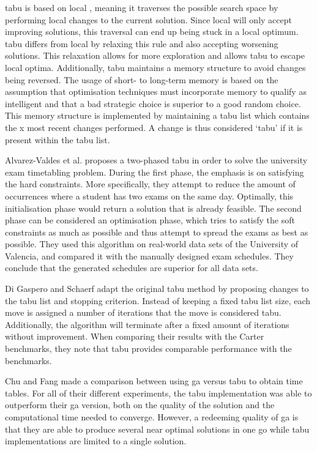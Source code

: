 \acrfull{tabu} \cite{glover1993} is based on \acrfull{local} \cite{lin1973}, meaning it traverses the possible search space by performing local changes to the current solution. Since \acrshort{local} will only accept improving solutions, this traversal can end up being stuck in a local optimum. \acrshort{tabu} differs from \acrshort{local} by relaxing this rule and also accepting worsening solutions. This relaxation allows for more exploration and allows \acrshort{tabu} to escape local optima. Additionally, \acrshort{tabu} maintains a memory structure to avoid changes being reversed. The usage of short- to long-term memory is  based on the assumption that optimisation techniques must incorporate memory to qualify as intelligent and that a bad strategic choice is superior to a good random choice\cite{glover1999}. This memory structure is implemented by maintaining a tabu list which contains the x most recent changes performed. A change is thus considered ‘tabu’ if it is present within the tabu list.

Alvarez-Valdes et al. \cite{alvarez1997} proposes a two-phased \acrlong{tabu} in order to solve the university exam timetabling problem. During
the first phase, the emphasis is on satisfying the hard constraints. More specifically, they attempt to reduce the amount of occurrences where a student has two exams on the same day. Optimally, this initialisation phase would return a solution that is already feasible. The second phase can be considered an optimisation phase, which tries to satisfy the soft constraints as much as possible and thus attempt to spread the exams as best as possible. They used this algorithm on real-world data sets of the University of Valencia, and compared it with the manually designed exam schedules. They conclude that the generated schedules are superior for all data sets.

Di Gaspero and Schaerf \cite{gaspero2001} adapt the original \acrshort{tabu} method by proposing changes to the tabu list and stopping criterion. Instead of keeping a fixed tabu list size, each move is assigned a number of iterations that the move is considered tabu. Additionally, the algorithm will terminate after a fixed amount of iterations without improvement. When comparing their results with the Carter benchmarks, they note that \acrlong{tabu} provides comparable performance with the benchmarks.

Chu and Fang \cite{Chu2000} made a comparison between using \acrlong{ga} versus \acrlong{tabu} to obtain time tables. For all of their different experiments, the \acrfull{tabu} implementation was able to outperform their \acrshort{ga} version, both on the quality of the solution and the computational time needed to converge. However, a redeeming quality of \acrlong{ga} is that they are able to produce several near optimal solutions in one go while \acrlong{tabu} implementations are limited to a single solution. 


